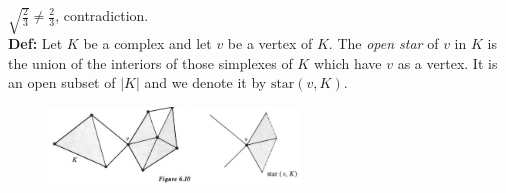 \documentclass[a4paper]{article}
\begin{document}
$\sqrt{\frac{2}{3}}\neq 
\frac{2}{3}$, contradiction.\\
\linebreak
\textbf{Def:} Let $K$ be a complex and let $v$ be a vertex of $K$. The
\textit{open star} of $v$ in $K$ is the union of the interiors of those
simplexes of $K$ which have $v$ as a vertex. It is an open subset of $\left| K \right| $ 
and we denote it by $\text{star}(v, K)$.
\begin{figure}[H]
    \centering
    \includegraphics[width=0.6\textwidth]{star.png}
    \label{fig:star-png}
\end{figure}
\end{document}
